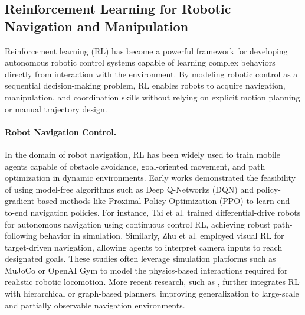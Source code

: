 \documentclass[english, 12pt, a4paper, elec, utf8, a-2b, online]{aaltothesis}
\begin{document}
\subsection{Reinforcement Learning for Robotic Navigation and Manipulation}

Reinforcement learning (RL) has become a powerful framework for developing autonomous robotic control systems capable of learning complex behaviors directly from interaction with the environment. By modeling robotic control as a sequential decision-making problem, RL enables robots to acquire navigation, manipulation, and coordination skills without relying on explicit motion planning or manual trajectory design.

\paragraph{Robot Navigation Control.}
In the domain of robot navigation, RL has been widely used to train mobile agents capable of obstacle avoidance, goal-oriented movement, and path optimization in dynamic environments. Early works demonstrated the feasibility of using model-free algorithms such as Deep Q-Networks (DQN) \cite{mnih2015human} and policy-gradient-based methods like Proximal Policy Optimization (PPO) \cite{schulman2017proximal} to learn end-to-end navigation policies. For instance, Tai et al. \cite{tai2017virtual} trained differential-drive robots for autonomous navigation using continuous control RL, achieving robust path-following behavior in simulation. Similarly, Zhu et al. \cite{zhu2017target} employed visual RL for target-driven navigation, allowing agents to interpret camera inputs to reach designated goals. These studies often leverage simulation platforms such as MuJoCo \cite{todorov2012mujoco} or OpenAI Gym \cite{brockman2016openai} to model the physics-based interactions required for realistic robotic locomotion. More recent research, such as \cite{9351818}, further integrates RL with hierarchical or graph-based planners, improving generalization to large-scale and partially observable navigation environments.
\end{document}
